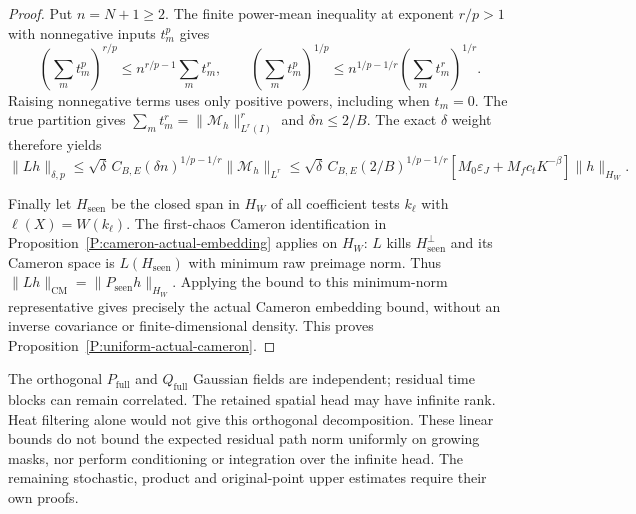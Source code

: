 \begin{proof}
  Put $n=N+1\ge2$. The finite power-mean inequality at exponent
  $r/p>1$ with nonnegative inputs $t_m^p$ gives
  \[
    \left(\sum_m t_m^p\right)^{r/p}
    \le n^{r/p-1}\sum_m t_m^r,\qquad
    \left(\sum_m t_m^p\right)^{1/p}
    \le n^{1/p-1/r}\left(\sum_m t_m^r\right)^{1/r}.
  \]
  Raising nonnegative terms uses only positive powers, including
  when $t_m=0$. The true partition gives
  $\sum_m t_m^r=\|\mathcal M_h\|_{L^r(I)}^r$ and $\delta n\le2/B$.
  The exact $\delta$ weight therefore yields
  \[
    \|Lh\|_{\delta,p}
    \le\sqrt\delta\,C_{B,E}(\delta n)^{1/p-1/r}\|\mathcal M_h\|_{L^r}
    \le\sqrt\delta\,C_{B,E}(2/B)^{1/p-1/r}
    [M_0\varepsilon_J+M_fc_tK^{-\beta}]\|h\|_{H_W}.
  \]

  Finally let $H_{\mathrm{seen}}$ be the closed span in $H_W$
  of all coefficient tests $k_\ell$ with $\ell(X)=W(k_\ell)$.
  The first-chaos Cameron identification in
  Proposition~\ref{P:cameron-actual-embedding} applies on $H_W$:
  $L$ kills $H_{\mathrm{seen}}^\perp$ and its Cameron space is
  $L(H_{\mathrm{seen}})$ with minimum raw preimage norm.
  Thus $\|Lh\|_{\mathrm{CM}}=\|P_{\mathrm{seen}}h\|_{H_W}$.
  Applying the bound to this minimum-norm representative gives
  precisely the actual Cameron embedding bound, without an
  inverse covariance or finite-dimensional density.
  This proves Proposition~\ref{P:uniform-actual-cameron}.
\end{proof}

The orthogonal $P_{\mathrm{full}}$ and $Q_{\mathrm{full}}$ Gaussian
fields are independent; residual time blocks can remain correlated.
The retained spatial head may have infinite rank.
Heat filtering alone would not give this orthogonal decomposition.
These linear bounds do not bound the expected residual path norm
uniformly on growing masks, nor perform conditioning or integration
over the infinite head. The remaining stochastic, product and
original-point upper estimates require their own proofs.
